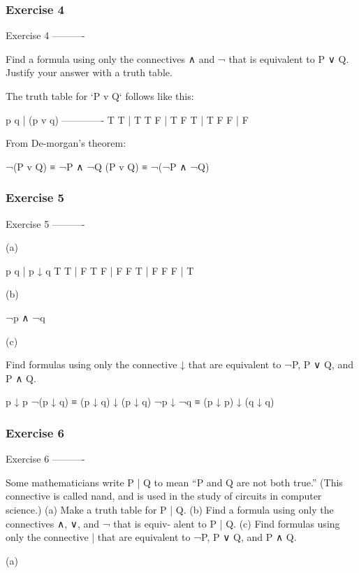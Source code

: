 \subsubsection{Exercise 4}
Exercise 4
----------

    Find a formula using only the connectives ∧ and ¬ that is equivalent to
    P ∨ Q. Justify your answer with a truth table.

The truth table for `P v Q` follows like this:

    p q | (p v q)
    -------------
    T T | T
    T F | T
    F T | T
    F F | F

From De-morgan's theorem:

    ¬(P v Q) ≡ ¬P ∧ ¬Q
    (P v Q) ≡ ¬(¬P ∧ ¬Q)

\subsubsection{Exercise 5}
Exercise 5
----------

(a)

    p q | p ↓ q
    T T | F
    T F | F
    F T | F
    F F | T

(b)

    ¬p ∧ ¬q

(c)

Find formulas using only the connective ↓ that are equivalent to ¬P,
P ∨ Q, and P ∧ Q.

    p ↓ p
    ¬(p ↓ q) ≡ (p ↓ q) ↓ (p ↓ q)
    ¬p ↓ ¬q  ≡ (p ↓ p) ↓ (q ↓ q)

\subsubsection{Exercise 6}
Exercise 6
----------

    Some mathematicians write P | Q to mean “P and Q are not both true.”
    (This connective is called nand, and is used in the study of circuits in
    computer science.)
    (a) Make a truth table for P | Q.
    (b) Find a formula using only the connectives ∧, ∨, and ¬ that is equiv-
    alent to P | Q.
    (c) Find formulas using only the connective | that are equivalent to ¬P,
    P ∨ Q, and P ∧ Q.

(a)

